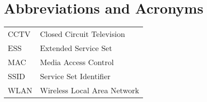 \chapter*{Abbreviations and Acronyms}


\noindent
\begin{longtable}{@{}p{}p{}@{}}
CCTV & Closed Circuit Television \\
ESS & Extended Service Set \\
MAC & Media Access Control \\
SSID & Service Set Identifier \\
WLAN & Wireless Local Area Network \\
\end{longtable}
